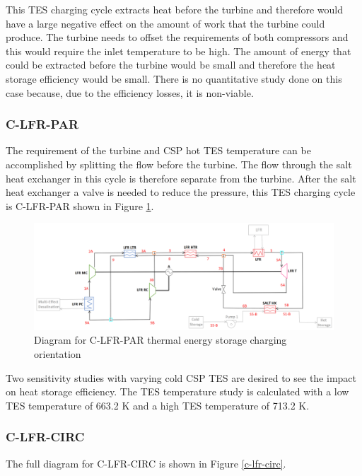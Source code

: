 \begin{paracol}{2}
\linenumbers
\switchcolumn

This TES charging cycle extracts heat before the turbine and therefore would have a large negative effect on the amount of work that the turbine could produce. The turbine needs to offset the requirements of both compressors and this would require the inlet temperature to be high. The amount of energy that could be extracted before the turbine would be small and therefore the heat storage efficiency would be small. There is no quantitative study done on this case because, due to the efficiency losses, it is non-viable. 

\subsubsection{C-LFR-PAR} %

The requirement of the turbine and CSP hot TES temperature can be accomplished by splitting the flow before the turbine. The flow through the salt heat exchanger in this cycle is therefore separate from the turbine. After the salt heat exchanger a valve is needed to reduce the pressure, this TES charging cycle is C-LFR-PAR shown in Figure \ref{c-lfr-par}.

\end{paracol}
\begin{figure}[H]
    \widefigure
    \includegraphics[width=\linewidth]{Definitions/c-lfr-par.pdf}
    \caption{Diagram for C-LFR-PAR thermal energy storage charging orientation\label{c-lfr-par}}
\end{figure}
\begin{paracol}{2}
\linenumbers
\switchcolumn

Two sensitivity studies with varying cold CSP TES are desired to see the impact on heat storage efficiency. The TES temperature study is calculated with a low TES temperature of 663.2 K and a high TES temperature of 713.2 K. 

\subsubsection{C-LFR-CIRC} %

The full diagram for C-LFR-CIRC is shown in Figure \ref{c-lfr-circ}.

\end{paracol}
